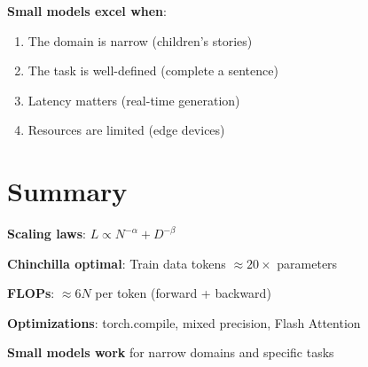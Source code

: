 \begin{keypoint}
\textbf{Small models excel when}:
\begin{enumerate}
    \item The domain is narrow (children's stories)
    \item The task is well-defined (complete a sentence)
    \item Latency matters (real-time generation)
    \item Resources are limited (edge devices)
\end{enumerate}
\end{keypoint}

\section{Summary}

\begin{summary}
    \item \textbf{Scaling laws}: $L \propto N^{-\alpha} + D^{-\beta}$
    \item \textbf{Chinchilla optimal}: Train data tokens $\approx 20 \times$ parameters
    \item \textbf{FLOPs}: $\approx 6N$ per token (forward + backward)
    \item \textbf{Optimizations}: torch.compile, mixed precision, Flash Attention
    \item \textbf{Small models work} for narrow domains and specific tasks
\end{summary}
